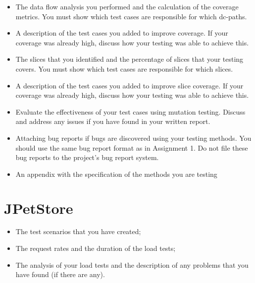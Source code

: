 \documentclass[fontsize=12pt,paper=letter,twoside]{scrartcl}
\begin{document}
\begin{itemize}
\item The data flow analysis you performed and the calculation of the coverage metrics. You must
show which test cases are responsible for which dc-paths.
\item A description of the test cases you added to improve coverage. If your coverage was already high,
discuss how your testing was able to achieve this.
\item The slices that you identified and the percentage of slices that your testing covers. You must
show which test cases are responsible for which slices.
\item A description of the test cases you added to improve slice coverage. If your coverage was
already high, discuss how your testing was able to achieve this.
\item Evaluate the effectiveness of your test cases using mutation testing. Discuss and address any
issues if you have found in your written report.
\item Attaching bug reports if bugs are discovered using your testing methods. You should use the
same bug report format as in Assignment 1. Do not file these bug reports to the project’s bug
report system.
\item An appendix with the specification of the methods you are testing
\end{itemize}

\section{JPetStore}

\begin{itemize}
\item The test scenarios that you have created;
\item The request rates and the duration of the load tests;
\item The analysis of your load tests and the description of any problems that you have found (if there
are any).
\end{itemize}
\end{document}
